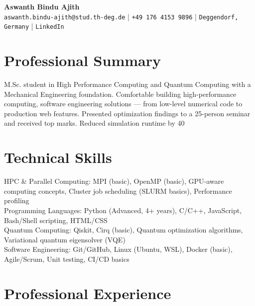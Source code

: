 \documentclass[11pt,a4paper]{article}
\begin{document}
\begin{center}
    {\LARGE\bfseries Aswanth Bindu Ajith}\\[4pt]
    \texttt{aswanth.bindu-ajith@stud.th-deg.de} | \texttt{+49 176 4153 9896} | \texttt{Deggendorf, Germany} | \texttt{LinkedIn}
\end{center}

\section{Professional Summary}
M.Sc. student in High Performance Computing and Quantum Computing with a Mechanical Engineering foundation. Comfortable building high-performance computing, software engineering solutions — from low-level numerical code to production web features. Presented optimization findings to a 25-person seminar and received top marks. Reduced simulation runtime by 40%

\section{Technical Skills}

HPC & Parallel Computing: MPI (basic), OpenMP (basic), GPU-aware computing concepts, Cluster job scheduling (SLURM basics), Performance profiling\\

Programming Languages: Python (Advanced, 4+ years), C/C++, JavaScript, Bash/Shell scripting, HTML/CSS\\

Quantum Computing: Qiskit, Cirq (basic), Quantum optimization algorithms, Variational quantum eigensolver (VQE)\\

Software Engineering: Git/GitHub, Linux (Ubuntu, WSL), Docker (basic), Agile/Scrum, Unit testing, CI/CD basics


\section{Professional Experience}
\end{document}
